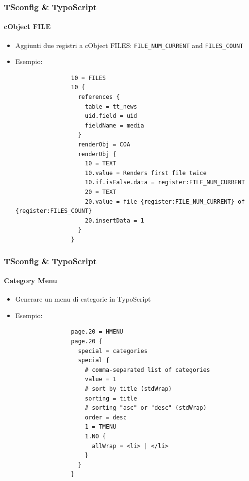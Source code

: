 
\begin{frame}[fragile]
	\frametitle{TSconfig \& TypoScript}
	\framesubtitle{cObject FILE}

	\begin{itemize}
		\item Aggiunti due registri a cObject FILES:\newline
			\texttt{FILE\_NUM\_CURRENT} and \texttt{FILES\_COUNT}

		\item Esempio:

			\lstset{
				basicstyle=\tiny\ttfamily
			}

			\begin{lstlisting}
				10 = FILES
				10 {
				  references {
				    table = tt_news
				    uid.field = uid
				    fieldName = media
				  }
				  renderObj = COA
				  renderObj {
				    10 = TEXT
				    10.value = Renders first file twice
				    10.if.isFalse.data = register:FILE_NUM_CURRENT
				    20 = TEXT
				    20.value = file {register:FILE_NUM_CURRENT} of {register:FILES_COUNT}
				    20.insertData = 1
				  }
				}
			\end{lstlisting}

	\end{itemize}

\end{frame}


\begin{frame}[fragile]
	\frametitle{TSconfig \& TypoScript}
	\framesubtitle{Category Menu}

	\begin{itemize}
		\item Generare un menu di categorie in TypoScript

		\item Esempio:

			\lstset{
				basicstyle=\tiny\ttfamily
			}

			\begin{lstlisting}
				page.20 = HMENU
				page.20 {
				  special = categories
				  special {
				    # comma-separated list of categories
				    value = 1
				    # sort by title (stdWrap)
				    sorting = title
				    # sorting "asc" or "desc" (stdWrap)
				    order = desc
				    1 = TMENU
				    1.NO {
				      allWrap = <li> | </li>
				    }
				  }
				}
			\end{lstlisting}

	\end{itemize}

\end{frame}

